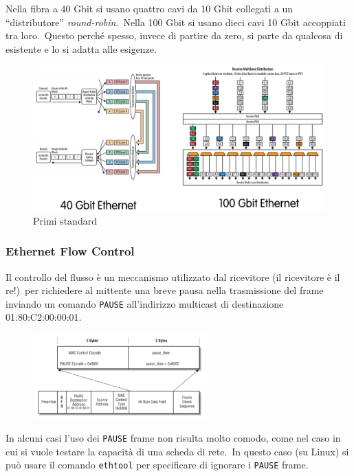 \noindent Nella fibra a 40 Gbit si usano quattro cavi da 10 Gbit collegati a un ``distributore'' \textit{round-robin}.\
Nella 100 Gbit si usano dieci cavi 10 Gbit accoppiati tra loro.\
Questo perché spesso, invece di partire da zero, si parte da qualcosa di esistente e lo si adatta alle esigenze.\

\begin{figure}[H]
    \centering
    \includegraphics[width=\textwidth]{immagini/40_100_Gbit.png}
    \caption*{Primi standard}
\end{figure}

\subsubsection{Ethernet Flow Control}

Il controllo del flusso è un meccanismo utilizzato dal ricevitore (il ricevitore è il re!)\ per richiedere al mittente una breve pausa nella trasmissione del frame inviando un comando \texttt{PAUSE} all'indirizzo multicast di destinazione 01:80:C2:00:00:01.

\begin{figure}[H]
    \centering
    \includegraphics[width=0.6\textwidth]{immagini/Flow_control.png}
\end{figure}

\noindent In alcuni casi l'uso dei \texttt{PAUSE} frame non risulta molto comodo, come nel caso in cui si vuole testare la capacità di una scheda di rete.\
In questo caso (su Linux) si può usare il comando \texttt{ethtool} per specificare di ignorare i \texttt{PAUSE} frame.


